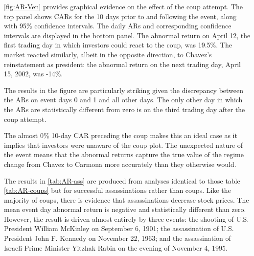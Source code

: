 \documentclass[12pt,final,fleqn]{article}
\theoremstyle{plain}
\begin{document}
\autoref{fig:AR-Ven} provides graphical evidence on the effect of the coup attempt. The top panel shows CARs for the 10 days prior to and following the event, along with 95\% confidence intervals. The daily ARs and corresponding confidence intervals are displayed in the bottom panel. The abnormal return on April 12, the first trading day in which investors could react to the coup, was 19.5\%. The market reacted similarly, albeit in the opposite direction, to Chavez's reinstatement as president: the abnormal return on the next trading day, April 15, 2002, was -14\%.

The results in the figure are particularly striking given the discrepancy between the ARs on event days 0 and 1 and all other days. The only other day in which the ARs are statistically different from zero is on the third trading day after the coup attempt.

The almost 0\% 10-day CAR preceding the coup makes this an ideal case as it implies that investors were unaware of the coup plot. The unexpected nature of the event means that the abnormal returns capture the true value of the regime change from Chavez to Carmona more accurately than they otherwise would.

The results in \autoref{tab:AR-ass} are produced from analyses identical to those table \autoref{tab:AR-coups} but for successful assassinations rather than coups. Like the majority of coups, there is evidence that assassinations decrease stock prices. The mean event day abnormal return is negative and statistically different than zero. However, the result is driven almost entirely by three events: the shooting of U.S. President William McKinley on September 6, 1901; the assassination of U.S. President John F. Kennedy on November 22, 1963; and the assassination of Israeli Prime Minister Yitzhak Rabin on the evening of November 4, 1995.
\end{document}
